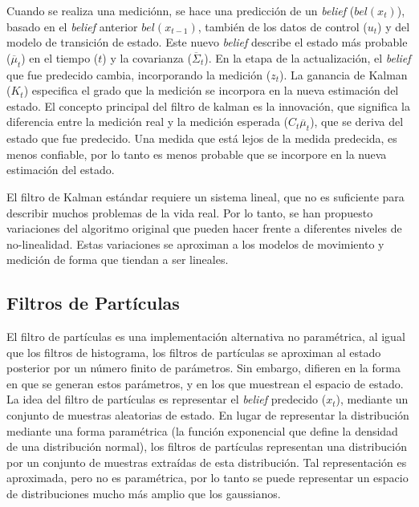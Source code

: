 Cuando se realiza una medici\'onn, se hace una predicci\'on de un \textit{belief} 
($bel(x_{t})$),\\ basado en el \textit{belief} anterior $bel(x_{t-1})$, tambi\'en de los 
datos de control ($u_{t}$) y del modelo de transición de estado. Este nuevo \textit{belief}
describe el estado más probable ($\overline{\mu}_{t}$) en el tiempo ($t$) y la covarianza 
($\overline{\Sigma}_{t}$). En la etapa de la actualización, el \textit{belief} que fue predecido 
cambia, incorporando la medici\'on ($z_{t}$). La ganancia de Kalman ($K_{t}$) especifica el
grado que la medici\'on se incorpora en la nueva estimación del estado. El concepto principal 
del filtro de kalman es la innovaci\'on, que significa la diferencia entre la medici\'on 
real y la medici\'on esperada ($C_{t}\overline{\mu}_{t}$), que se deriva del estado que fue 
predecido. Una medida que está lejos de la medida predecida, es menos confiable, por lo tanto 
es menos probable que se incorpore en la nueva estimación del estado.

El filtro de Kalman estándar requiere un sistema lineal, que no es suficiente para 
describir muchos problemas de la vida real. Por lo tanto, se han propuesto 
variaciones del algoritmo original que pueden hacer frente a diferentes niveles de 
no-linealidad. Estas variaciones se aproximan a los modelos de movimiento y medición 
de forma que tiendan a ser lineales.


\subsection{Filtros de Part\'iculas}
El filtro de part\'iculas es una implementaci\'on alternativa no param\'etrica, 
al igual que los filtros de histograma, los filtros de part\'iculas se aproximan 
al estado posterior por un n\'umero finito de par\'ametros. Sin embargo, 
difieren en la forma en que se generan estos par\'ametros, y en los que 
muestrean el espacio de estado. La idea del filtro de part\'iculas es 
representar el \textit{belief} predecido ($x_{t}$), mediante un conjunto 
de muestras aleatorias de estado. En lugar de representar la distribuci\'on 
mediante una forma param\'etrica (la funci\'on exponencial que define 
la densidad de una distribuci\'on normal), los filtros de part\'iculas 
representan una distribuci\'on por un conjunto de muestras extra\'idas 
de esta distribuci\'on. Tal representaci\'on es aproximada, pero no 
es param\'etrica, por lo tanto se puede representar un espacio de 
distribuciones mucho m\'as amplio que los gaussianos.


